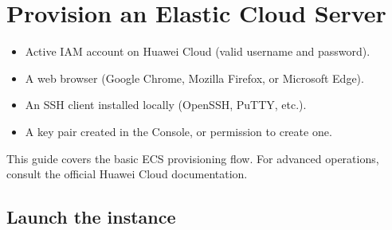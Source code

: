 \documentclass[english]{guide}
\begin{document}
\makecover

\sumario

\startbody

\section{Provision an Elastic Cloud Server}

\begin{objetivos}

  \prerequisitos
  \begin{itemize}
    \item Active IAM account on Huawei Cloud (valid username and password).
    \item A web browser (Google Chrome, Mozilla Firefox, or Microsoft Edge).
    \item An SSH client installed locally (OpenSSH, PuTTY, etc.).
    \item A key pair created in the Console, or permission to create one.
  \end{itemize}
\end{objetivos}

\begin{info}
This guide covers the basic ECS provisioning flow. For advanced operations,
consult the official Huawei Cloud documentation.
\end{info}

\subsection{Launch the instance}

\end{document}
